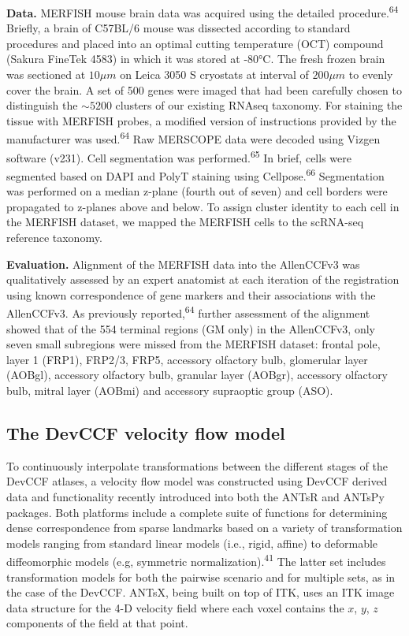 \documentclass[
  12pt,
]{article}
\begin{document}
\textbf{Data.} MERFISH mouse brain data was acquired using the detailed
procedure.\textsuperscript{64} Briefly, a brain of C57BL/6 mouse was
dissected according to standard procedures and placed into an optimal
cutting temperature (OCT) compound (Sakura FineTek 4583) in which it was
stored at -80°C. The fresh frozen brain was sectioned at \(10 \mu m\) on
Leica 3050 S cryostats at interval of \(200 \mu m\) to evenly cover the
brain. A set of 500 genes were imaged that had been carefully chosen to
distinguish the \(\sim5200\) clusters of our existing RNAseq taxonomy.
For staining the tissue with MERFISH probes, a modified version of
instructions provided by the manufacturer was used.\textsuperscript{64}
Raw MERSCOPE data were decoded using Vizgen software (v231). Cell
segmentation was performed.\textsuperscript{65} In brief, cells were
segmented based on DAPI and PolyT staining using
Cellpose.\textsuperscript{66} Segmentation was performed on a median
z-plane (fourth out of seven) and cell borders were propagated to
z-planes above and below. To assign cluster identity to each cell in the
MERFISH dataset, we mapped the MERFISH cells to the scRNA-seq reference
taxonomy.

\textbf{Evaluation.} Alignment of the MERFISH data into the AllenCCFv3
was qualitatively assessed by an expert anatomist at each iteration of
the registration using known correspondence of gene markers and their
associations with the AllenCCFv3. As previously
reported,\textsuperscript{64} further assessment of the alignment showed
that of the 554 terminal regions (GM only) in the AllenCCFv3, only seven
small subregions were missed from the MERFISH dataset: frontal pole,
layer 1 (FRP1), FRP2/3, FRP5, accessory olfactory bulb, glomerular layer
(AOBgl), accessory olfactory bulb, granular layer (AOBgr), accessory
olfactory bulb, mitral layer (AOBmi) and accessory supraoptic group
(ASO).

\hypertarget{the-devccf-velocity-flow-model-1}{%
\subsection{The DevCCF velocity flow
model}\label{the-devccf-velocity-flow-model-1}}

To continuously interpolate transformations between the different stages
of the DevCCF atlases, a velocity flow model was constructed using
DevCCF derived data and functionality recently introduced into both the
ANTsR and ANTsPy packages. Both platforms include a complete suite of
functions for determining dense correspondence from sparse landmarks
based on a variety of transformation models ranging from standard linear
models (i.e., rigid, affine) to deformable diffeomorphic models (e.g,
symmetric normalization).\textsuperscript{41} The latter set includes
transformation models for both the pairwise scenario and for multiple
sets, as in the case of the DevCCF. ANTsX, being built on top of ITK,
uses an ITK image data structure for the 4-D velocity field where each
voxel contains the \(x\), \(y\), \(z\) components of the field at that
point.
\end{document}
